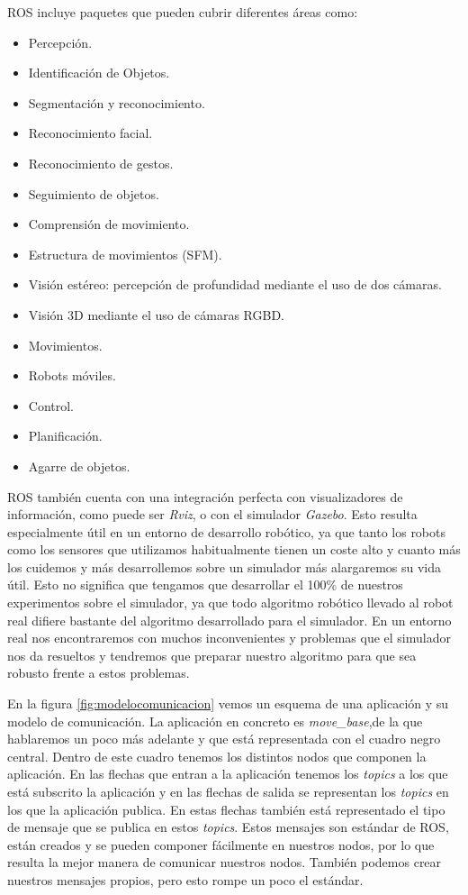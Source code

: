 ROS incluye paquetes que pueden cubrir diferentes áreas como: 
\begin{itemize}
\item Percepción.
\item Identificación de Objetos.
\item Segmentación y reconocimiento.
\item Reconocimiento facial.
\item Reconocimiento de gestos.
\item Seguimiento de objetos.
\item Comprensión de movimiento.
\item Estructura de movimientos (SFM).
\item Visión estéreo: percepción de profundidad mediante el uso de dos cámaras.
\item Visión 3D mediante el uso de cámaras RGBD.
\item Movimientos.
\item Robots móviles.
\item Control.
\item Planificación.
\item Agarre de objetos.
\end{itemize}

ROS también cuenta con una integración perfecta con visualizadores de información, como puede ser \textit{Rviz}, o con el simulador \textit{Gazebo}. Esto resulta especialmente útil en un entorno de desarrollo robótico, ya que tanto los robots como los sensores que utilizamos habitualmente tienen un coste alto y cuanto más los cuidemos y más desarrollemos sobre un simulador más alargaremos su vida útil. Esto no significa que tengamos que desarrollar el 100\% de nuestros experimentos sobre el simulador, ya que todo algoritmo robótico llevado al robot real difiere bastante del algoritmo desarrollado para el simulador. En un entorno real nos encontraremos con muchos inconvenientes y problemas que el simulador nos da resueltos y tendremos que preparar nuestro algoritmo para que sea robusto frente a estos problemas.

En la figura \ref{fig:modelocomunicacion} vemos un esquema de una aplicación y su modelo de comunicación. La aplicación en concreto es \textit{move\_base},de la que hablaremos un poco más adelante y que está representada con el cuadro negro central. Dentro de este cuadro tenemos los distintos nodos que componen la aplicación. En las flechas que entran a la aplicación tenemos los \textit{topics} a los que está subscrito la aplicación y en las flechas de salida se representan los \textit{topics} en los que la aplicación publica. En estas flechas también está representado el tipo de mensaje que se publica en estos \textit{topics}. Estos mensajes son estándar de ROS, están creados y se pueden componer fácilmente en nuestros nodos, por lo que resulta la mejor manera de comunicar nuestros nodos. También podemos crear nuestros mensajes propios, pero esto rompe un poco el estándar. 

